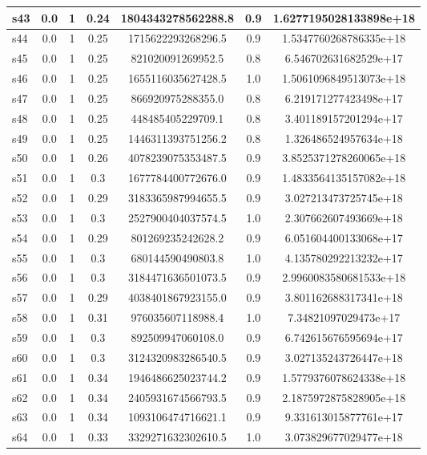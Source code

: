 \documentclass{article}
\begin{document}
\begin{tabular}{|l|c|c|c|c|c|c|}
\hline
s43 &0.0 & 1 & 0.24 & 1804343278562288.8 & 0.9 & 1.6277195028133898e+18\\
\hline
s44 &0.0 & 1 & 0.25 & 1715622293268296.5 & 0.9 & 1.5347760268786335e+18\\
\hline
s45 &0.0 & 1 & 0.25 & 821020091269952.5 & 0.8 & 6.546702631682529e+17\\
\hline
s46 &0.0 & 1 & 0.25 & 1655116035627428.5 & 1.0 & 1.5061096849513073e+18\\
\hline
s47 &0.0 & 1 & 0.25 & 866920975288355.0 & 0.8 & 6.219171277423498e+17\\
\hline
s48 &0.0 & 1 & 0.25 & 448485405229709.1 & 0.8 & 3.401189157201294e+17\\
\hline
s49 &0.0 & 1 & 0.25 & 1446311393751256.2 & 0.8 & 1.326486524957634e+18\\
\hline
s50 &0.0 & 1 & 0.26 & 4078239075353487.5 & 0.9 & 3.8525371278260065e+18\\
\hline
s51 &0.0 & 1 & 0.3 & 1677784400772676.0 & 0.9 & 1.4833564135157082e+18\\
\hline
s52 &0.0 & 1 & 0.29 & 3183365987994655.5 & 0.9 & 3.027213473725745e+18\\
\hline
s53 &0.0 & 1 & 0.3 & 2527900404037574.5 & 1.0 & 2.307662607493669e+18\\
\hline
s54 &0.0 & 1 & 0.29 & 801269235242628.2 & 0.9 & 6.051604400133068e+17\\
\hline
s55 &0.0 & 1 & 0.3 & 680144590490803.8 & 1.0 & 4.135780292213232e+17\\
\hline
s56 &0.0 & 1 & 0.3 & 3184471636501073.5 & 0.9 & 2.9960083580681533e+18\\
\hline
s57 &0.0 & 1 & 0.29 & 4038401867923155.0 & 0.9 & 3.801162688317341e+18\\
\hline
s58 &0.0 & 1 & 0.31 & 976035607118988.4 & 1.0 & 7.34821097029473e+17\\
\hline
s59 &0.0 & 1 & 0.3 & 892509947060108.0 & 0.9 & 6.742615676595694e+17\\
\hline
s60 &0.0 & 1 & 0.3 & 3124320983286540.5 & 0.9 & 3.027135243726447e+18\\
\hline
s61 &0.0 & 1 & 0.34 & 1946486625023744.2 & 0.9 & 1.5779376078624338e+18\\
\hline
s62 &0.0 & 1 & 0.34 & 2405931674566793.5 & 0.9 & 2.1875972875828905e+18\\
\hline
s63 &0.0 & 1 & 0.34 & 1093106474716621.1 & 0.9 & 9.331613015877761e+17\\
\hline
s64 &0.0 & 1 & 0.33 & 3329271632302610.5 & 1.0 & 3.073829677029477e+18\\

\end{tabular}
\end{document}
